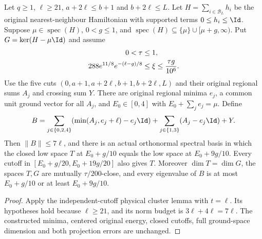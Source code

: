 \begin{lemma}
    \label{thm:five_region_scaled_low_cluster}
    \leanok
    Let $q\ge1$, $\ell\ge21$, $a+2\ell\le b+1$ and $b+2\ell\le L$.
    Let $H=\sum_{i\in\mathcal B_L}h_i$ be the original nearest-neighbour
    Hamiltonian with supported terms $0\le h_i\le\Id$.
    Suppose $\mu\in\operatorname{spec}(H)$, $0<g\le1$, and
    $\operatorname{spec}(H)\subseteq\{\mu\}\cup[\mu+g,\infty)$.
    Put $G=\ker(H-\mu\Id)$ and assume
    \begin{align}
        0<\tau                     & \le1,\notag                   \\
        288e^{11/8}e^{-(\ell-g)/8} & \le\xi\le\frac{\tau g}{10^6}.
    \end{align}
    Use the five cuts $(0,a+1,a+2\ell,b+1,b+2\ell,L)$ and their original
    regional sums $A_j$ and crossing sum $Y$.
    There are original regional minima $e_j$, a common unit ground vector
    for all $A_j$, and $E_0\in[0,4]$ with $E_0+\sum_j e_j=\mu$.
    Define
    \begin{align}
        B=\sum_{j\in\{0,2,4\}}(\min(A_j,e_j+\ell)-e_j\Id)
        +\sum_{j\in\{1,3\}}(A_j-e_j\Id)+Y.
    \end{align}
    Then $\|B\|\le7\ell$, and there is an actual orthonormal spectral basis
    in which the closed low space $T$ at $E_0+g/10$ equals the low space
    at $E_0+9g/10$. Every cutoff in
    $[E_0+g/20,E_0+19g/20]$ also gives $T$.
    Moreover $\dim T=\dim G$, the spaces $T,G$ are mutually
    $\tau/200$-close, and every eigenvalue of $B$ is at most $E_0+g/10$
    or at least $E_0+9g/10$.
\end{lemma}
\begin{proof}
    \leanok
    Apply the independent-cutoff physical cluster lemma with $t=\ell$.
    Its hypotheses hold because $\ell\ge21$, and its norm budget is
    $3\ell+4\ell=7\ell$. The constructed minima, centered original
    energy, closed cutoffs, full ground-space dimension and both
    projection errors are unchanged.
\end{proof}


